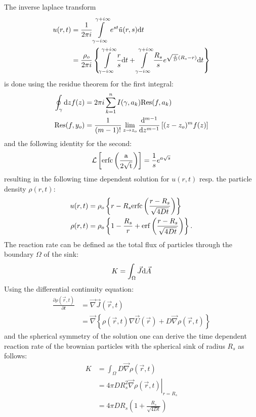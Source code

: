 The inverse laplace transform
\begin{align}
    u(r,t)  &= \frac{1}{2 \pi i} \int\limits_{\gamma - i \infty}^{\gamma + i \infty}  e^{st} \tilde{u}(r,s){\rm d}t \\
    &= \frac{\rho_o}{ 2 \pi i} \left\{  \int\limits_{\gamma - i \infty}^{\gamma + i \infty} \frac{r}{s}  {\rm d}t +  \int\limits_{\gamma - i \infty}^{\gamma + i \infty}\frac{R_s}{s} e^{ \sqrt{\frac{s}{D}}(R_s - r) }  {\rm d}t \right\}
    \label{inverse laplace}
\end{align}
is done using the residue theorem for the first integral:
\begin{align}
    \oint_{ \gamma } {\rm d}z f(z) &= 2 \pi i \sum_{k = 1}^{n}I(\gamma, a_k) {\rm Res}(f,a_k) \\
    { \rm Res}(f,y_o) &= \frac{1}{(m-1)!} \lim_{z\rightarrow z_o} \frac{{ \rm d} ^{m-1}}{{\rm d} z^{m-1}} \left[ (z - z_o)^{m}f(z) \right]
    \label{residue theorem}
\end{align}
and the following identity for the second:
\begin{equation}
    \mathcal{L}\left[ {\rm erfc\left( \frac{a}{2\sqrt{t}} \right)} \right] = \frac{1}{s}e^{a\sqrt{s}}
    \label{L(erfc)}
\end{equation}
resulting in the following time dependent solution for $u(r,t)$ resp. the particle density $\rho(r,t)$:
\begin{align}
    u(r,t) &= \rho_o \left\{ r - R_s {\rm erfc} \left( \frac{r - R_s}{\sqrt{4 D t}} \right) \right\} \\
    \rho(r,t) &= \rho_o \left\{ 1 - \frac{R_s}{r} + {\rm erf} \left( \frac{r - R_s}{\sqrt{4Dt}} \right) \right\}.
    \label{u(r,t)}
\end{align}
The reaction rate can be defined as the total flux of particles through the boundary $\Omega$ of the sink:
\begin{equation}
    K = \int_\Omega \vec{J} {\rm d}\vec{A} 
    \label{reaction rate}
\end{equation}
Using the differential continuity equation:
\begin{align}
    \frac{\partial \rho(\vec{r},t)}{\partial t}&= \vec{\nabla} \vec{J}(\vec{r},t) \\
    &= \vec{\nabla} \left\{ \rho(\vec{r},t) \nabla \vec{U}(\vec{r}) + D \vec{\nabla} \rho(\vec{r},t) \right\}
    \label{contiuity equation}
\end{align}
and the spherical symmetry of the solution one can derive the time dependent reaction rate of the brownian particles with the spherical sink of radius $R_s$ as follows:
\begin{align}
    K &= \int_\Omega D  \vec{\nabla} \rho(\vec{r},t) \\
    &= 4 \pi D R_s^2 \left. \vec{\nabla} \rho(\vec{r},t) \right|_{r = R_s}\\
    &= 4 \pi D R_s \left( 1 + \frac{R_s}{\sqrt{4Dt}} \right)
    \label{ideal reaction rate}
\end{align}


